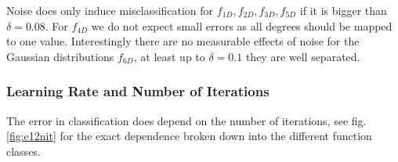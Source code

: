 \documentclass[useAMS,usenatbib]{templates/mn2e}
\begin{document}
%
Noise does only induce misclassification for
$f_{1D},f_{2D},f_{3D},f_{5D}$ if it is bigger than $\delta=0.08$. For $f_{4D}$ we do not expect small errors as all degrees should be mapped to one value. Interestingly there are no measurable effects of noise for the Gaussian distributions $f_{6D}$, at least up to $\delta=0.1$ they are well separated.


\subsubsection{Learning Rate and Number of Iterations}

The error in classification does depend on the number of iterations, see fig. \ref{fig:e12nit} for the exact dependence broken down into the different function classes.
\end{document}
